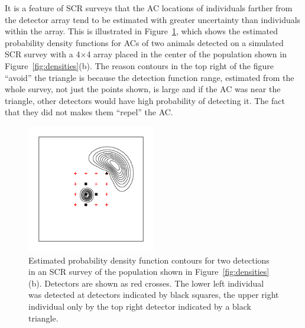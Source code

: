 \documentclass[useAMS,usenatbib,referee]{biom}
\begin{document}
It is a feature of SCR surveys that the AC locations of individuals farther from the detector array tend to be estimated with greater uncertainty than individuals within the array. This is illustrated in Figure~\ref{fig:screrr}, which shows the estimated probability density functions for ACs of two animals detected on a simulated SCR survey with a 4$\times$4 array placed in the center of the population shown in Figure~\ref{fig:densities}(b). The reason contours in the top right of the figure ``avoid'' the triangle is because the detection function range, estimated from the whole survey, not just the points shown, is large and if the AC was near the triangle, other detectors would have high probability of detecting it. The fact that they did not makes them ``repel'' the AC. %

\begin{figure}[htbp]
\centering
\includegraphics[width=0.5\textwidth]{screrr.pdf}
\caption{Estimated probability density function contours for two detections in an SCR survey of the population shown in Figure~\ref{fig:densities}(b). Detectors are shown as red crosses. The lower left individual was detected at detectors indicated by black squares, the upper right individual only by the top right detector indicated by a black triangle.}
\label{fig:screrr}
\end{figure}
\end{document}
